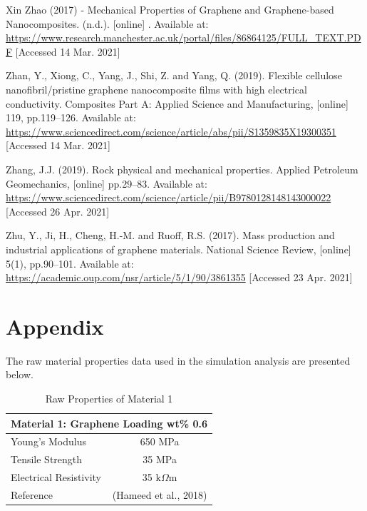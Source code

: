 \documentclass[a4paper,12pt]{article}
\numberwithin{equation}{section}
\numberwithin{figure}{section}
\begin{document}
\noindent Xin Zhao (2017) - Mechanical Properties of Graphene and Graphene-based Nanocomposites. (n.d.). [online] . Available at: \url{https://www.research.manchester.ac.uk/portal/files/86864125/FULL_TEXT.PDF} [Accessed 14 Mar. 2021]\vspace{\baselineskip}

\noindent Zhan, Y., Xiong, C., Yang, J., Shi, Z. and Yang, Q. (2019). Flexible cellulose nanofibril/pristine graphene nanocomposite films with high electrical conductivity. Composites Part A: Applied Science and Manufacturing, [online] 119, pp.119–126. Available at: \url{https://www.sciencedirect.com/science/article/abs/pii/S1359835X19300351} [Accessed 14 Mar. 2021]\vspace{\baselineskip}

\noindent Zhang, J.J. (2019). Rock physical and mechanical properties. Applied Petroleum Geomechanics, [online] pp.29–83. Available at: \url{https://www.sciencedirect.com/science/article/pii/B9780128148143000022} [Accessed 26 Apr. 2021]\vspace{\baselineskip}

\noindent Zhu, Y., Ji, H., Cheng, H.-M. and Ruoff, R.S. (2017). Mass production and industrial applications of graphene materials. National Science Review, [online] 5(1), pp.90–101. Available at: \url{https://academic.oup.com/nsr/article/5/1/90/3861355} [Accessed 23 Apr. 2021]\vspace{\baselineskip}


\newpage
\section*{Appendix}
{}

\noindent The raw material properties data used in the simulation analysis are presented below.

\begin{table}[hbt!]
\centering
\caption{Raw Properties of Material 1}
\begin{tabular}{|l|c|}
\hline
\multicolumn{2}{|c|}{\textbf{Material 1: Graphene Loading wt\% 0.6}} \\ \hline
Young's Modulus                   & 650 MPa                          \\ \hline
Tensile Strength                  & 35 MPa                           \\ \hline
Electrical Resistivity            & 35 k$\Omega$m                    \\ \hline
Reference                         & (Hameed et al., 2018)            \\ \hline
\end{tabular}
\end{table}
\end{document}

